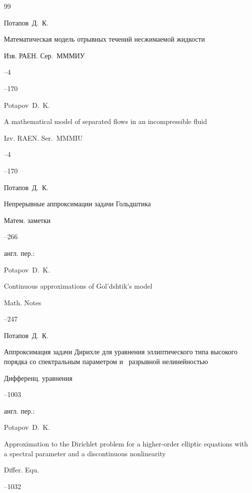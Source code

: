 \begin{thebibliography}{99}

\by Потапов~Д.~К.

\paper Математическая модель отрывных течений несжимаемой  жидкости

\jour Изв. РАЕН. Сер.~МММИУ



--4

--170

\misctransl 

\by Potapov~D.~K.

\paper A mathematical model of separated flows in an  incompressible fluid

\jour Izv. RAEN. Ser.~MMMIU



--4

--170




\by Потапов~Д.~К.

\paper Непрерывные аппроксимации задачи Гольдштика

\jour Матем. заметки




--266

\transl  англ. пер.:~

\by Potapov~D.~K.

\paper Continuous approximations of Gol'dshtik's model

\jour  Math. Notes




--247




\by Потапов~Д.~К.

\paper Аппроксимация задачи Дирихле для уравнения  эллиптического типа высокого порядка со спектральным параметром и~ разрывной нелинейностью

\jour Дифференц. уравнения




--1003

\transl  англ. пер.:~

\by Potapov~D.~K.

\paper Approximation to the Dirichlet problem for a  higher-order elliptic equations with a spectral parameter and a discontinuous nonlinearity

 \jour Differ. Equ.




 --1032



\end{thebibliography}
